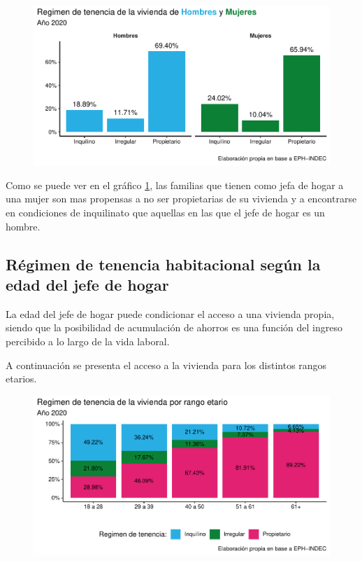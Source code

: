 \documentclass[
]{article}
\begin{document}
\begin{figure}[htbp!]
\includegraphics{habitacional_files/figure-latex/unnamed-chunk-8-1.pdf}
\caption{\label{fig:1}}
\end{figure}
\newpage
Como se puede ver en el gráfico \ref{fig:1}, las familias que tienen como jefa de
hogar a una mujer son mas propensas a no ser propietarias de su vivienda
y a encontrarse en condiciones de inquilinato que aquellas en las que el
jefe de hogar es un hombre.

\hypertarget{ruxe9gimen-de-tenencia-habitacional-seguxfan-la-edad-del-jefe-de-hogar}{%
\subsection{Régimen de tenencia habitacional según la edad del jefe de
hogar}\label{ruxe9gimen-de-tenencia-habitacional-seguxfan-la-edad-del-jefe-de-hogar}}

La edad del jefe de hogar puede condicionar el acceso a una vivienda
propia, siendo que la posibilidad de acumulación de ahorros es una
función del ingreso percibido a lo largo de la vida laboral.

A continuación se presenta el acceso a la vivienda para los distintos
rangos etarios.

\begin{figure}[htbp!]
\includegraphics{habitacional_files/figure-latex/unnamed-chunk-9-1.pdf}
\caption{\label{fig:2}}
\end{figure}
\end{document}
